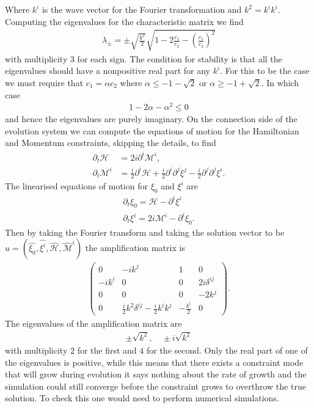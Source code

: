 \documentclass[10pt]{report}
\theoremstyle{definition}
\begin{document}
    Where $k^i$ is the wave vector for the Fourier transformation and $k^2 = k^i k^i$. Computing the eigenvalues for the characteristic matrix we find 
    \begin{align}
        \lambda_\pm = \pm \sqrt{\frac{k^2}{2}} \sqrt{1-2\frac{c_1}{c_2}-\left(\frac{c_1}{c_2}\right)^2}
    \end{align}
    with multiplicity 3 for each sign. The condition for stability is that all the eigenvalues should have a nonpositive real part for any $k^i$. For this to be the case we must require that $c_1 = \alpha c_2$ where $\alpha \leq -1 -\sqrt{2}$ or $\alpha \geq -1 + \sqrt{2}$. In which case
    \begin{align}
        1-2\alpha-\alpha^2 \leq 0 \label{eq:pleb-num-alpha-constraint-range}
    \end{align}
    and hence the eigenvalues are purely imaginary. On the connection side of the evolution system we can compute the equations of motion for the Hamiltonian and Momentum constraints, skipping the details, to find 
    \begin{align}
        \partial_t \mathcal{H} & = 2i \partial^i \mathcal{M}^i, \\
        \partial_t \mathcal{M}^i & = \frac{i}{2} \partial^i \mathcal{H} + \frac{i}{2} \partial^i \partial^j \xi^j - \frac{i}{2} \partial^j \partial^j \xi^i.
    \end{align}
    The linearised equations of motion for $\xi_0$ and $\xi^i$ are 
    \begin{align}
        \partial_t \xi_0 = \mathcal{H} - \partial^i \xi^i \\
        \partial_t \xi^i = 2i \mathcal{M}^i - \partial^i \xi_0.
    \end{align}
    Then by taking the Fourier transform and taking the solution vector to be $u = (\hat{\xi_0},\hat{\xi^i},\hat{\mathcal{H}},\hat{\mathcal{M}}^i)$ the amplification matrix is 
    \begin{align}
        \begin{pmatrix}
            0 & -i k^j & 1 & 0 \\ -ik^i & 0 & 0 & 2i \delta^{ij} \\ 0 & 0 & 0 & -2k^j \\ 0 & \frac{i}{2} k^2 \delta^{ij} - \frac{i}{2} k^i k^j & -\frac{k^i}{2} & 0 
        \end{pmatrix}.
    \end{align}
    The eigenvalues of the amplification matrix are 
    \begin{align}
        \pm \sqrt{k^2}, \quad \pm i\sqrt{k^2}
    \end{align}
    with multiplicity $2$ for the first and $4$ for the second. Only the real part of one of the eigenvalues is positive, while this means that there exists a constraint mode that will grow during evolution it says nothing about the rate of growth and the simulation could still converge before the constraint grows to overthrow the true solution. To check this one would need to perform numerical simulations.
\end{document}
